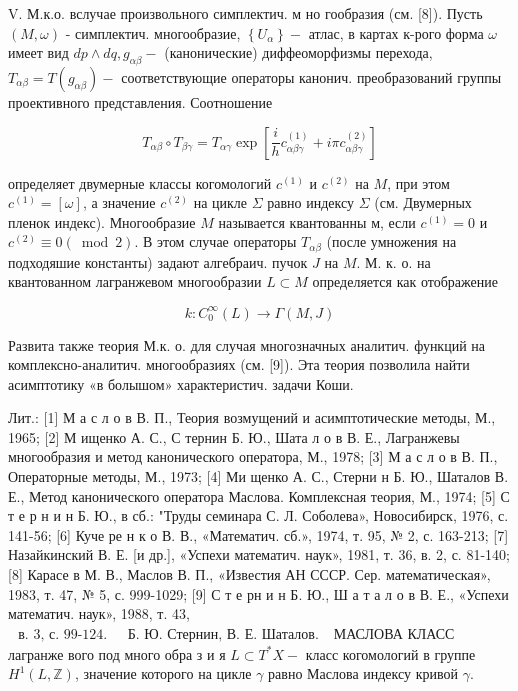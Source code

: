 \documentclass[10pt]{article}
\begin{document}
V. М.к.о. вслучае произвольного симплектич. м но гообразия (см. [8]). Пусть $(M, \omega)$ - симплектич. многообразие, $\left\{U_{\alpha}\right\}-$ атлас, в картах к-рого форма $\omega$ имеет вид $d p \wedge d q, g_{\alpha \beta}-$ (канонические) диффеоморфизмы перехода, $T_{\alpha \beta}=T\left(g_{\alpha \beta}\right)-$ соответствующие операторы канонич. преобразований группы проективного представления. Соотношение



\[

T_{\alpha \beta} \circ T_{\beta \gamma}=T_{\alpha \gamma} \exp \left[\frac{i}{h} c_{\alpha \beta \gamma}^{(1)}+i \pi c_{\alpha \beta \gamma}^{(2)}\right]

\]



определяет двумерные классы когомологий $c^{(1)}$ и $c^{(2)}$ на $M$, при этом $c^{(1)}=[\omega]$, а значение $c^{(2)}$ на цикле $\Sigma$ равно индексу $\Sigma$ (см. Двумерных пленок индекс). Многообразие $M$ называется квантованны м, если $c^{(1)}=0$ и $c^{(2)} \equiv 0(\bmod 2)$. В этом случае операторы $T_{\alpha \beta}$ (после умножения на подходяшие константы) задают алгебраич. пучок $J$ на $M$. М. к. о. на квантованном лагранжевом многообразии $L \subset M$ определяется как отображение



\[

k: C_{0}^{\infty}(L) \rightarrow \Gamma(M, J)

\]



Развита также теория М.к. о. для случая многозначных аналитич. функций на комплексно-аналитич. многообразиях (см. [9]). Эта теория позволила найти асимптотику «в болышом» характеристич. задачи Коши.



Лит.: [1] М а с л о в В. П., Теория возмущений и асимптотические методы, М., 1965; [2] М ищенко А. С., С тернин Б. Ю., Шата л о в В. Е., Лагранжевы многообразия и метод канонического оператора, М., 1978; [3] М а с л о в В. П., Операторные методы, М., 1973; [4] Ми щенко А. С., Стерни н Б. Ю., Шаталов В. Е., Метод канонического оператора Маслова. Комплексная теория, М., 1974; [5] С т е р н и н Б. Ю., в сб.: "Труды семинара С. Л. Соболева», Новосибирск, 1976, с. 141-56; [6] Куче ре н к о В. В., «Математич. сб.», 1974, т. 95, № 2, с. 163-213; [7] Назайкинский В. Е. [и др.], «Успехи математич. наук», 1981, т. 36, в. 2, с. 81-140; [8] Карасе в М. В., Маслов В. П., «Известия АН СССР. Сер. математическая», 1983, т. 47, № 5, с. 999-1029; [9] С т е рн и н Б. Ю., Ш а т а л о в В. Е., «Успехи математич. наук», 1988, т. 43, $\begin{array}{ll}\text { в. 3, с. 99-124. } & \text { Б. Ю. Стернин, В. Е. Шаталов. }\end{array}$ МАСЛОВА КЛАСС лагранже вого под много обра з и я $L \subset T^{*} X-$ класс когомологий в группе $H^{1}(L, \mathbb{Z})$, значение которого на цикле $\gamma$ равно Маслова индексу кривой $\gamma$.
\end{document}
